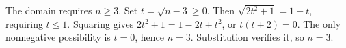 The domain requires $n\ge3$. Set $t=\sqrt{n-3}\ge0$. Then $\sqrt{2t^2+1}=1-t$, requiring $t\le1$. Squaring gives $2t^2+1=1-2t+t^2$, or $t(t+2)=0$. The only nonnegative possibility is $t=0$, hence $n=3$. Substitution verifies it, so $\boxed{n=3}$.
